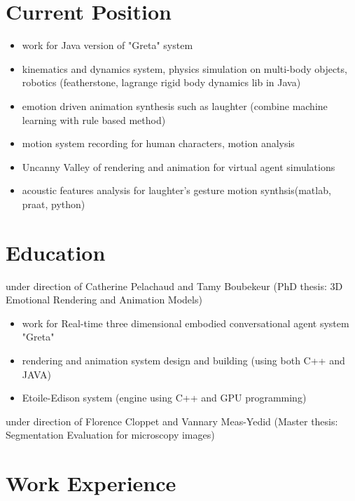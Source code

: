 \section{Current Position}
{
\begin{itemize}
	\item work for Java version of "Greta" system
	\item kinematics and dynamics system, physics simulation on multi-body objects, robotics (featherstone, lagrange rigid body dynamics lib in Java)
	\item emotion driven animation synthesis such as laughter (combine machine learning with rule based method)
	\item motion system recording for human characters, motion analysis
	\item Uncanny Valley of rendering and animation for virtual agent simulations
	\item acoustic features analysis for laughter's gesture motion synthsis(matlab, praat, python)
\end{itemize}
}


\section{Education}
{under direction of Catherine Pelachaud and Tamy Boubekeur (PhD thesis: 3D Emotional Rendering and Animation Models)
\begin{itemize}
	\item work for Real-time three dimensional embodied conversational agent system "Greta"
	\item rendering and animation system design and building (using both C++ and JAVA)
	\item Etoile-Edison system (engine using C++ and GPU programming)
\end{itemize}
}  %

{under direction of Florence Cloppet and Vannary Meas-Yedid (Master thesis: Segmentation Evaluation for microscopy images)
}


\section{Work Experience}

